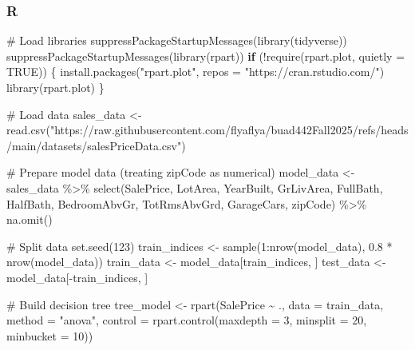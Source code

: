 \documentclass[
  letterpaper,
  DIV=11,
  numbers=noendperiod]{scrartcl}
\newenvironment{Shaded}{\begin{snugshade}}{\end{snugshade}}
\newcommand{\AttributeTok}[1]{\textcolor[rgb]{0.40,0.45,0.13}{#1}}
\newcommand{\CommentTok}[1]{\textcolor[rgb]{0.37,0.37,0.37}{#1}}
\newcommand{\ConstantTok}[1]{\textcolor[rgb]{0.56,0.35,0.01}{#1}}
\newcommand{\ControlFlowTok}[1]{\textcolor[rgb]{0.00,0.23,0.31}{\textbf{#1}}}
\newcommand{\DecValTok}[1]{\textcolor[rgb]{0.68,0.00,0.00}{#1}}
\newcommand{\FloatTok}[1]{\textcolor[rgb]{0.68,0.00,0.00}{#1}}
\newcommand{\FunctionTok}[1]{\textcolor[rgb]{0.28,0.35,0.67}{#1}}
\newcommand{\NormalTok}[1]{\textcolor[rgb]{0.00,0.23,0.31}{#1}}
\newcommand{\OtherTok}[1]{\textcolor[rgb]{0.00,0.23,0.31}{#1}}
\newcommand{\SpecialCharTok}[1]{\textcolor[rgb]{0.37,0.37,0.37}{#1}}
\newcommand{\StringTok}[1]{\textcolor[rgb]{0.13,0.47,0.30}{#1}}
\begin{document}
\subsubsection{R}\label{r}

\begin{Shaded}
\begin{Highlighting}[]
\CommentTok{\# Load libraries}
\FunctionTok{suppressPackageStartupMessages}\NormalTok{(}\FunctionTok{library}\NormalTok{(tidyverse))}
\FunctionTok{suppressPackageStartupMessages}\NormalTok{(}\FunctionTok{library}\NormalTok{(rpart))}
\ControlFlowTok{if}\NormalTok{ (}\SpecialCharTok{!}\FunctionTok{require}\NormalTok{(rpart.plot, }\AttributeTok{quietly =} \ConstantTok{TRUE}\NormalTok{)) \{}
  \FunctionTok{install.packages}\NormalTok{(}\StringTok{"rpart.plot"}\NormalTok{, }\AttributeTok{repos =} \StringTok{"https://cran.rstudio.com/"}\NormalTok{)}
  \FunctionTok{library}\NormalTok{(rpart.plot)}
\NormalTok{\}}

\CommentTok{\# Load data}
\NormalTok{sales\_data }\OtherTok{\textless{}{-}} \FunctionTok{read.csv}\NormalTok{(}\StringTok{"https://raw.githubusercontent.com/flyaflya/buad442Fall2025/refs/heads/main/datasets/salesPriceData.csv"}\NormalTok{)}

\CommentTok{\# Prepare model data (treating zipCode as numerical)}
\NormalTok{model\_data }\OtherTok{\textless{}{-}}\NormalTok{ sales\_data }\SpecialCharTok{\%\textgreater{}\%}
  \FunctionTok{select}\NormalTok{(SalePrice, LotArea, YearBuilt, GrLivArea, FullBath, HalfBath, }
\NormalTok{         BedroomAbvGr, TotRmsAbvGrd, GarageCars, zipCode) }\SpecialCharTok{\%\textgreater{}\%}
  \FunctionTok{na.omit}\NormalTok{()}

\CommentTok{\# Split data}
\FunctionTok{set.seed}\NormalTok{(}\DecValTok{123}\NormalTok{)}
\NormalTok{train\_indices }\OtherTok{\textless{}{-}} \FunctionTok{sample}\NormalTok{(}\DecValTok{1}\SpecialCharTok{:}\FunctionTok{nrow}\NormalTok{(model\_data), }\FloatTok{0.8} \SpecialCharTok{*} \FunctionTok{nrow}\NormalTok{(model\_data))}
\NormalTok{train\_data }\OtherTok{\textless{}{-}}\NormalTok{ model\_data[train\_indices, ]}
\NormalTok{test\_data }\OtherTok{\textless{}{-}}\NormalTok{ model\_data[}\SpecialCharTok{{-}}\NormalTok{train\_indices, ]}

\CommentTok{\# Build decision tree}
\NormalTok{tree\_model }\OtherTok{\textless{}{-}} \FunctionTok{rpart}\NormalTok{(SalePrice }\SpecialCharTok{\textasciitilde{}}\NormalTok{ ., }
                    \AttributeTok{data =}\NormalTok{ train\_data,}
                    \AttributeTok{method =} \StringTok{"anova"}\NormalTok{,}
                    \AttributeTok{control =} \FunctionTok{rpart.control}\NormalTok{(}\AttributeTok{maxdepth =} \DecValTok{3}\NormalTok{, }
                                          \AttributeTok{minsplit =} \DecValTok{20}\NormalTok{, }
                                          \AttributeTok{minbucket =} \DecValTok{10}\NormalTok{))}


\end{Highlighting}
\end{Shaded}
\end{document}

